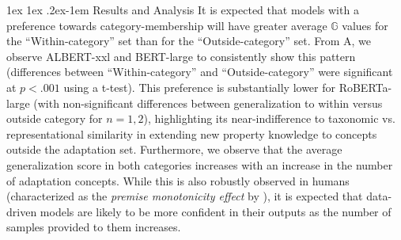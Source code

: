 \documentclass[10pt,letterpaper]{article}
\makeatletter
\renewcommand{\paragraph}{%
  \@startsection{paragraph}{4}%
  {\z@}{1ex \@plus 1ex \@minus .2ex}{-1em}%
  {\normalfont\normalsize\bfseries}%
}
\makeatother
\begin{document}
\paragraph{Results and Analysis}
It is expected that models with a preference towards category-membership will have greater average $\mathbb{G}$ values for the ``Within-category'' set than for the ``Outside-category'' set.
From A, we observe ALBERT-xxl and BERT-large to consistently 
show this pattern (differences between ``Within-category'' and ``Outside-category'' were significant at $p<.001$ using a t-test). This preference is substantially lower for RoBERTa-large (with non-significant differences between generalization to within versus outside category for $n=1,2$), highlighting its near-indifference to taxonomic vs. representational similarity in extending new property knowledge to concepts outside the adaptation set.
Furthermore, we observe that the average generalization score in both categories increases with an increase in the number of adaptation concepts. While this is also robustly observed in humans (characterized as the \textit{premise monotonicity effect} by \citeauthor{osherson1990category}), it is expected that data-driven models are likely to be more confident in their outputs as the number of samples provided to them increases.
\end{document}
